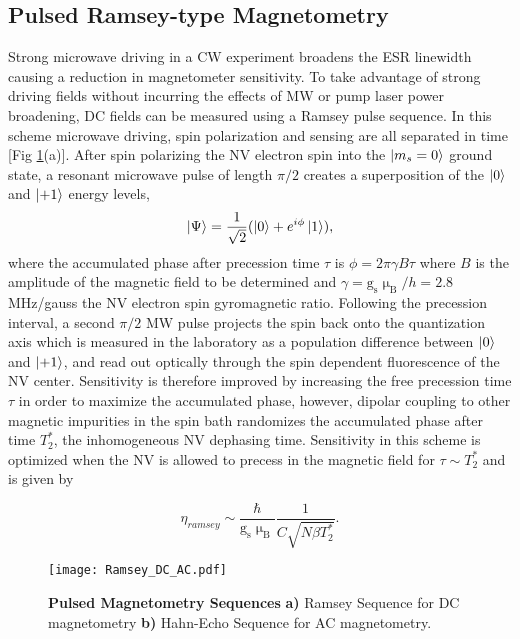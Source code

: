 
\subsection{Pulsed Ramsey-type Magnetometry} \label{Pulsed_Ramsey}

Strong microwave driving in a CW experiment broadens the ESR linewidth causing a reduction in magnetometer sensitivity. To take advantage of strong driving fields without incurring the effects of MW or pump laser power broadening, DC fields can be measured using a Ramsey pulse sequence. In this scheme microwave driving, spin polarization and sensing are all separated in time [Fig \ref{Fig_two}(a)]. After spin polarizing the NV electron spin into the $\ket{m_s = 0}$ ground state, a resonant microwave pulse of length $\pi/2$ creates a superposition of the $\ket{0}$ and $\ket{+1}$ energy levels,
$$\ket{\Psi} = \frac{1}{\sqrt{2}}(\ket{0} + e^{i\phi}\ket{1}),$$
where the accumulated phase after precession time $\tau$ is $\phi = 2\pi \gamma B \tau$ where $B$ is the amplitude of the magnetic field to be determined and $\gamma = \text{g}_\text{s} \upmu_\text{B} / h = 2.8$ MHz/gauss the NV electron spin gyromagnetic ratio. Following the precession interval, a second $\pi/2$ MW pulse projects the spin back onto the quantization axis which is measured in the laboratory as a population difference between $\ket{0}$ and $\ket{+1}$, and read out optically through the spin dependent fluorescence of the NV center. Sensitivity is therefore improved by increasing the free precession time $\tau$ in order to maximize the accumulated phase, however, dipolar coupling to other magnetic impurities in the spin bath randomizes the accumulated phase after time $T_2^*$, the inhomogeneous NV dephasing time. Sensitivity in this scheme is optimized when the NV is allowed to precess in the magnetic field for $\tau \sim T_2^*$ and is given by 

$$\eta_{ramsey} \sim \frac{\hbar}{\text{g}_\text{s} \upmu_{\text{B}}} \frac{1}{C\sqrt{N \beta T_2^*}}.$$ 

\begin{figure}[t!]
\centering
\texttt{[image: Ramsey\_DC\_AC.pdf]}  
\caption{\textbf{Pulsed Magnetometry Sequences} \textbf{a)} Ramsey Sequence for DC magnetometry \textbf{b)} Hahn-Echo Sequence for AC magnetometry.}
\label{Fig_two}
\end{figure}

